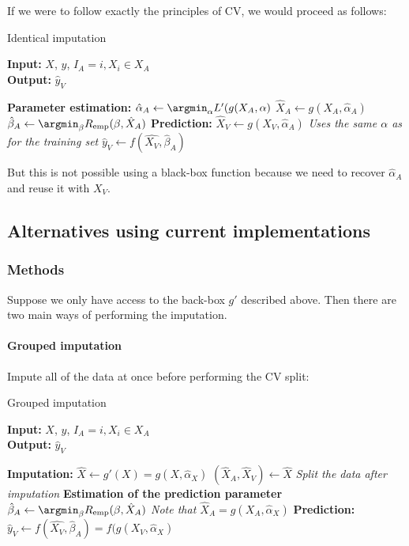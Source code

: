 If we were to follow exactly the principles of CV, we would proceed as follows: 
\begin{algorithm}[H]
	\caption{Identical imputation}
	\hspace*{\algorithmicindent} \textbf{Input:} $X$, $y$, $I_A={i, X_i \in X_A}$  \\
 	\hspace*{\algorithmicindent} \textbf{Output:} $\hat{y}_V$
	\begin{algorithmic}[1]
		\State \textbf{Parameter estimation:}
		\Indstate $\hat{\alpha}_A \leftarrow \argmin_{\alpha} L'(g(X_A,\alpha)$
		\Indstate $\hat{X}_A \leftarrow g(X_A, \hat{\alpha}_A)$
		\Indstate $\hat{\beta}_A \leftarrow \argmin_{\beta} R_{\text{emp}}(\beta,\hat{X}_A)$
		\State \textbf{Prediction:}
		\Indstate $\hat{X}_V \leftarrow g(X_V, \hat{\alpha}_A)$ \Comment \emph{Uses the same $\alpha$ as for the training set}
		\Indstate $\hat{y}_V \leftarrow f(\hat{X_V}, \hat{\beta}_A)$
	\end{algorithmic}
\end{algorithm}

But this is not possible using a black-box function because we need to recover $\hat{\alpha}_A$ and reuse it with $X_V$.

		\subsection{Alternatives using current implementations}
			\subsubsection{Methods}

Suppose we only have access to the back-box $g'$ described above. Then there are two main ways of performing the imputation.

\paragraph{Grouped imputation} 

Impute all of the data at once before performing the CV split:
\begin{algorithm}[H]
	\caption{Grouped imputation}
	\hspace*{\algorithmicindent} \textbf{Input:} $X$, $y$, $I_A={i, X_i \in X_A}$  \\
 	\hspace*{\algorithmicindent} \textbf{Output:} $\hat{y}_V$
	\begin{algorithmic}[1]
		\State \textbf{Imputation:}
		\Indstate $\hat{X} \leftarrow g'(X) = g(X, \hat{\alpha}_X)$ 
		\Indstate $(\hat{X}_A, \hat{X}_V) \leftarrow \hat{X}$ \Comment \emph{Split the data after imputation}
		\State \textbf{Estimation of the prediction parameter}
		\Indstate $\hat{\beta}_A \leftarrow \argmin_{\beta} R_{\text{emp}}(\beta,\hat{X}_A)$ \Comment \emph{Note that $\hat{X}_A = g(X_A, \hat{\alpha}_X)$}
		\State \textbf{Prediction:}
		\Indstate $\hat{y}_V \leftarrow f(\hat{X_V}, \hat{\beta}_A) = f(g(X_V, \hat{\alpha}_X)$
	\end{algorithmic}
\end{algorithm}

